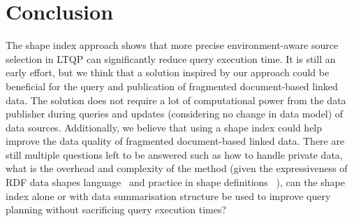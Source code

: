 \section{Conclusion}

The shape index approach shows that more precise environment-aware source selection in LTQP can significantly reduce query execution time.
It is still an early effort, but we think that a solution inspired by our approach could be beneficial for the query and publication of fragmented document-based linked data.
The solution does not require a lot of computational power from the data publisher during queries and updates (considering no change in data model) of data sources.
Additionally, we believe that using a shape index could help improve the data quality of fragmented document-based linked data.
There are still multiple questions left to be answered such as how to handle private data, what is the overhead and complexity of the method (given the expressiveness of RDF data shapes language~\cite{Delva2021, staworko_et_al:LIPIcs:2015:4985, 10.1007/978-3-319-68288-4_7} and practice in shape definitions~\cite{lieber_iswc_poster_2020, staworko_et_al:LIPIcs:2015:4985, Staworko2018ContainmentOS} ),
can the shape index alone or with data summarisation structure be used to improve query planning without sacrificing query execution times?
